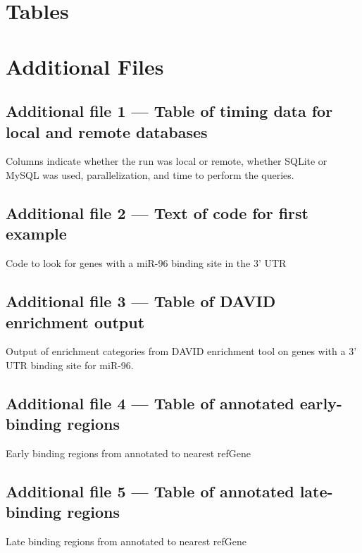 \documentclass[10pt]{bmc_article}
\newenvironment{bmcformat}{\baselineskip20pt\sloppy\setboolean{publ}{false}}{\baselineskip20pt\sloppy}
\begin{document}
\begin{bmcformat}

\section*{Tables}



\section*{Additional Files}
  \subsection*{Additional file 1 --- Table of timing data for local and remote databases}
  Columns indicate whether the run was local or remote, whether SQLite or MySQL was used,
  parallelization, and time to perform the queries.

  \subsection*{Additional file 2 --- Text of code for first example}
  Code to look for genes with a miR-96 binding site in the 3' UTR

  \subsection*{Additional file 3 --- Table of DAVID enrichment output }
  Output of enrichment categories from DAVID enrichment tool on genes with
  a 3' UTR binding site for miR-96.

  \subsection*{Additional file 4 --- Table of annotated early-binding regions}
  Early binding regions from \cite{Hansen} annotated to nearest refGene

  \subsection*{Additional file 5 --- Table of annotated late-binding regions}
  Late binding regions from \cite{Hansen} annotated to nearest refGene


\end{bmcformat}
\end{document}
